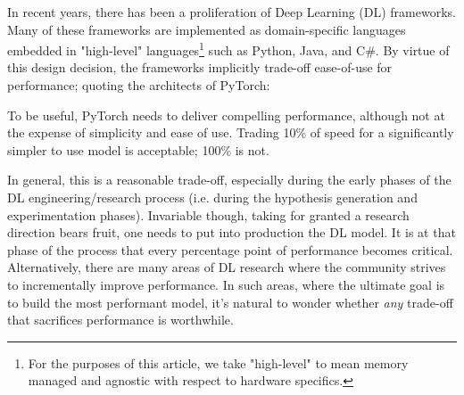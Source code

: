 \documentclass[sigconf]{acmart}
\begin{document}
In recent years, there has been a proliferation of Deep Learning (DL) frameworks\cite{paszke2019pytorch,abadi2016tensorflow,chen2015mxnet,cntk}.
Many of these frameworks are implemented as domain-specific languages embedded in "high-level" languages\footnote{For the purposes of this article, we take "high-level" to mean memory managed and agnostic with respect to hardware specifics.} such as Python, Java, and C\#.
By virtue of this design decision, the frameworks implicitly trade-off ease-of-use for performance; quoting the architects of PyTorch:
\begin{displayquote}
To be useful, PyTorch needs to deliver compelling performance, although not at the expense of simplicity and ease of use. Trading 10\% of speed for a significantly simpler to use model is acceptable; 100\% is not.
\end{displayquote}
In general, this is a reasonable trade-off, especially during the early phases of the DL engineering/research process (i.e. during the hypothesis generation and experimentation phases).
Invariable though, taking for granted a research direction bears fruit, one needs to put into production the DL model.
It is at that phase of the process that every percentage point of performance becomes critical.
Alternatively, there are many areas of DL research where the community strives to incrementally improve performance\cite{abdelhamed2020ntire,hall2020probability,ILSVRC15}.
In such areas, where the ultimate goal is to build the most performant model, it's natural to wonder whether \textit{any} trade-off that sacrifices performance is worthwhile.

\end{document}
